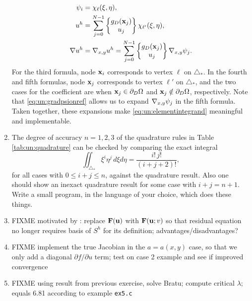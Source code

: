 \begin{enumerate}
\begin{align*}
\psi_i &= \chi_{\ell}(\xi,\eta), \\
u^h &= \sum_{j=0}^{N-1} \left\{\begin{matrix} g_D(\mathbf{x}_j) \\ u_j \end{matrix}\right\} \chi_{\ell'}(\xi,\eta), \\
\nabla u^h &= \nabla_{x,y} u^h = \sum_{j=0}^{N-1} \left\{\begin{matrix} g_D(\mathbf{x}_j) \\ u_j \end{matrix}\right\} \nabla_{x,y} \psi_j.
\end{align*}
For the third formula, node $\mathbf{x}_i$ corresponds to vertex $\ell$ on $\triangle_\ast$.  In the fourth and fifth formulas, node $\mathbf{x}_j$ corresponds to vertex $\ell'$ on $\triangle_\ast$, and the two cases for the coefficient are when $\mathbf{x}_j \in \partial_D \Omega$ and $\mathbf{x}_j \notin \partial_D \Omega$, respectively.  Note that \eqref{eq:un:gradpsionref} allows us to expand $\nabla_{x,y} \psi_j$ in the fifth formula.  Taken together, these expansions make \eqref{eq:un:elementintegrand} meaningful and implementable.
\item  \label{exer:un:checkquadrature}  The degree of accuracy $n=1,2,3$ of the quadrature rules in Table \ref{tab:un:quadrature} can be checked by comparing the exact integral
\begin{equation}
\iint_{\triangle_\ast} \xi^i \eta^j\,d\xi d\eta = \frac{i!\,j!}{(i+j+2)!}, \label{eq:un:checkquadrature}
\end{equation}
for all cases with $0\le i+j\le n$, against the quadrature result.  Also one should show an inexact quadrature result for some case with $i+j=n+1$.  Write a small program, in the language of your choice, which does these things.
\item \label{exer:un:basisfreeresidual} FIXME motivated by \citep{Loggetal2012}: replace $\mathbf{F}(\mathbf{u})$ with $\mathbf{F}(\mathbf{u};v)$ so that residual equation no longer requires basis of $S^h$ for its definition; advantages/disadvantages?
\item \label{exer:un:truejacobian} FIXME implement the true Jacobian in the $a=a(x,y)$ case, so that we only add a diagonal $\partial f/\partial u$ term; test on case 2 example and see if improved \pSNES convergence
\item \label{exer:un:bratu} FIXME using result from previous exercise, solve Bratu; compute critical $\lambda$; equals 6.81 according to \pSNES example \texttt{ex5.c}
\end{enumerate}

